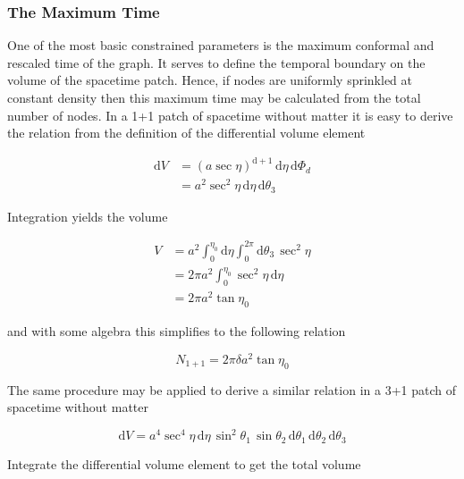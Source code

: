 \documentclass[preprint,notitlepage,amsmath,amssymb,floatfix]{revtex4-1}
\begin{document}
\subsubsection{The Maximum Time}
One of the most basic constrained parameters is the maximum conformal and rescaled time of the graph.
It serves to define the temporal boundary on the volume of the spacetime patch.  
Hence, if nodes are uniformly sprinkled at constant density then this maximum time may be calculated from the total number of nodes.
In a 1+1 patch of spacetime without matter it is easy to derive the relation from the definition of the differential volume element

\begin{equation}
\begin{split}
\mathrm{d}V &= \left(a\sec\eta\right)^{\mathrm{d}+1}\,\mathrm{d}\eta\,\mathrm{d}\Phi_d \\
   &= a^2\sec^2\eta\,\mathrm{d}\eta\,\mathrm{d}\theta_3
\end{split}
\end{equation}

\noindent Integration yields the volume

\begin{equation}
\begin{split}
V &= a^2\int_0^{\eta_0}\!\mathrm{d}\eta\int_0^{2\pi}\!\mathrm{d}\theta_3\,\sec^2\eta \\
  &= 2\pi a^2\int_0^{\eta_0}\!\sec^2\eta\,\mathrm{d}\eta \\
  &= 2\pi a^2\tan\eta_0
\end{split}
\end{equation}

\noindent and with some algebra this simplifies to the following relation

\begin{equation}
\label{eq:finalN1}
N_{\mathrm{1+1}} = 2\pi\delta a^2\tan\eta_0
\end{equation}

\noindent The same procedure may be applied to derive a similar relation in a 3+1 patch of spacetime without matter

\begin{equation}
\mathrm{d}V = a^4\sec^4\eta\,\mathrm{d}\eta\,\sin^2\theta_1\,\sin\theta_2\,\mathrm{d}\theta_1\,\mathrm{d}\theta_2\,\mathrm{d}\theta_3
\end{equation}

\noindent Integrate the differential volume element to get the total volume
\end{document}
